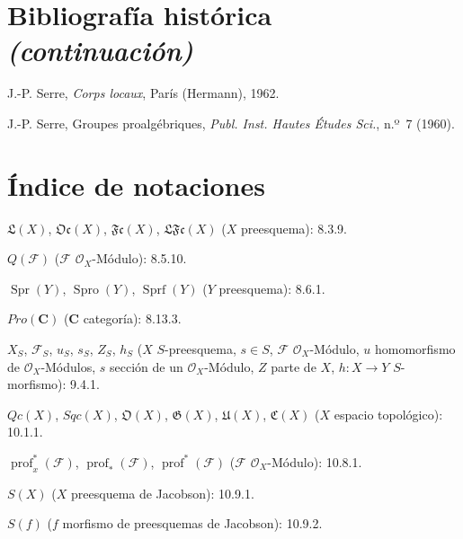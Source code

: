 \clearpage
{}
{}
\section*{Bibliografía histórica \textnormal{\emph{(continuación)}}}

\begin{description}[style=multiline,leftmargin=3.5em,labelwidth=2.8em]
  \item[{[39]}] J.-P. Serre, \emph{Corps locaux}, París (Hermann), 1962.
  \item[{[40]}] J.-P. Serre, Groupes proalgébriques,
  \emph{Publ. Inst. Hautes Études Sci.}, n.º~7 (1960).
\end{description}

\clearpage
{}
{}
\section*{Índice de notaciones}

\begingroup
\small
\setlength{\parindent}{0pt}
\setlength{\parskip}{2pt}

$\mathfrak{L}(X)$, $\mathfrak{Oc}(X)$, $\mathfrak{Fc}(X)$,
$\mathfrak{LFc}(X)$ ($X$ preesquema): 8.3.9.

$Q(\mathcal F)$ ($\mathcal F$ $\mathcal O_X$-Módulo): 8.5.10.

$\operatorname{Spr}(Y)$, $\operatorname{Spro}(Y)$,
$\operatorname{Sprf}(Y)$ ($Y$ preesquema): 8.6.1.

$\boldsymbol{\mathit{Pro}}(\boldsymbol{C})$ ($\boldsymbol{C}$ categoría): 8.13.3.

$X_S$, $\mathcal F_S$, $u_S$, $s_S$, $Z_S$, $h_S$
($X$ $S$-preesquema, $s\in S$, $\mathcal F$ $\mathcal O_X$-Módulo,
$u$ homomorfismo de $\mathcal O_X$-Módulos, $s$ sección de un
$\mathcal O_X$-Módulo, $Z$ parte de $X$, $h:X\to Y$ $S$-morfismo): 9.4.1.

$Qc(X)$, $Sqc(X)$, $\mathfrak O(X)$, $\mathfrak G(X)$,
$\mathfrak U(X)$, $\mathfrak C(X)$ ($X$ espacio topológico): 10.1.1.

$\operatorname{prof}^{*}_{x}(\mathcal F)$,
$\operatorname{prof}_{*}(\mathcal F)$,
$\operatorname{prof}^{*}(\mathcal F)$
($\mathcal F$ $\mathcal O_X$-Módulo): 10.8.1.

$S(X)$ ($X$ preesquema de Jacobson): 10.9.1.

$S(f)$ ($f$ morfismo de preesquemas de Jacobson): 10.9.2.

